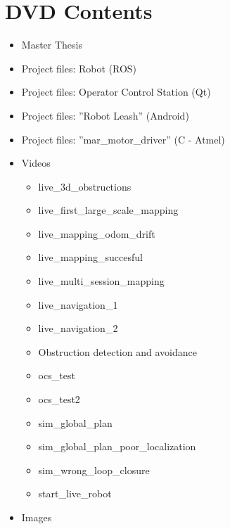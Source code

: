 \chapter{DVD Contents}
\label{chp:dvd_contents}



\begin{itemize}
	\item Master Thesis
	\item Project files: Robot (ROS)
	\item Project files: Operator Control Station (Qt)
	\item Project files: ''Robot Leash'' (Android)
	\item Project files: ''mar\_motor\_driver'' (C - Atmel)
	\item Videos
	\begin{itemize}
			\item live\_3d\_obstructions
			\item live\_first\_large\_scale\_mapping
			\item live\_mapping\_odom\_drift
			\item live\_mapping\_succesful
			\item live\_multi\_session\_mapping
			\item live\_navigation\_1
			\item live\_navigation\_2
			\item Obstruction detection and avoidance
			\item ocs\_test
			\item ocs\_test2
			\item sim\_global\_plan
			\item sim\_global\_plan\_poor\_localization
			\item sim\_wrong\_loop\_closure
			\item start\_live\_robot
	\end{itemize}
	\item Images

\end{itemize}